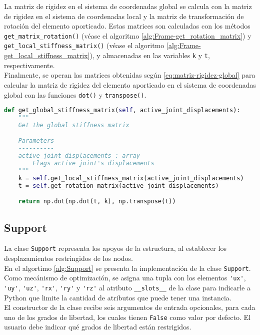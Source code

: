 La matriz de rigidez en el sistema de coordenadas global se calcula con la matriz de rigidez en el sistema de coordenadas local y la matriz de transformación de rotación del elemento aporticado. Estas matrices son calculadas con los métodos \verb|get_matrix_rotation()| (véase el algoritmo \ref{alg:Frame-get_rotation_matrix}) y \verb|get_local_stiffness_matrix()| (véase el algoritmo \ref{alg:Frame-get_local_stiffness_matrix}), y almacenadas en las variables \verb|k| y \verb|t|, respectivamente.\\

Finalmente, se operan las matrices obtenidas según \eqref{eq:matriz-rigidez-global} para calcular la matriz de rigidez del elemento aporticado en el sistema de coordenadas global con las funciones \verb|dot()| y \verb|transpose()|.\\

\begin{lstlisting}[language=Python,caption=Método \texttt{get\_global\_stiffness\_matrix()} de la clase \texttt{Frame}.,label=alg:Frame-get_global_stiffness_matrix, frame=single]
def get_global_stiffness_matrix(self, active_joint_displacements):
    """
    Get the global stiffness matrix

    Parameters
    ----------
    active_joint_displacements : array
        Flags active joint's displacements
    """
    k = self.get_local_stiffness_matrix(active_joint_displacements)
    t = self.get_rotation_matrix(active_joint_displacements)

    return np.dot(np.dot(t, k), np.transpose(t))
\end{lstlisting}

\subsection{Support}
La clase \verb|Support| representa los apoyos de la estructura, al establecer los desplazamientos restringidos de los nodos.\\

En el algortimo \ref{alg:Support} se presenta la implementación de la clase \verb|Support|. Como mecánismo de optimización, se asigna una tupla con los elementos \verb|'ux'|, \verb|'uy'|, \verb|'uz'|, \verb|'rx'|, \verb|'ry'| y \verb|'rz'| al atributo \verb|__slots__| de la clase para indicarle a Python que limite la cantidad de atributos que puede tener una instancia.\\

El constructor de la clase recibe seis argumentos de entrada opcionales, para cada uno de los grados de libertad, los cuales tienen \verb|False| como valor por defecto. El usuario debe indicar qué grados de libertad están restrigidos.\\

